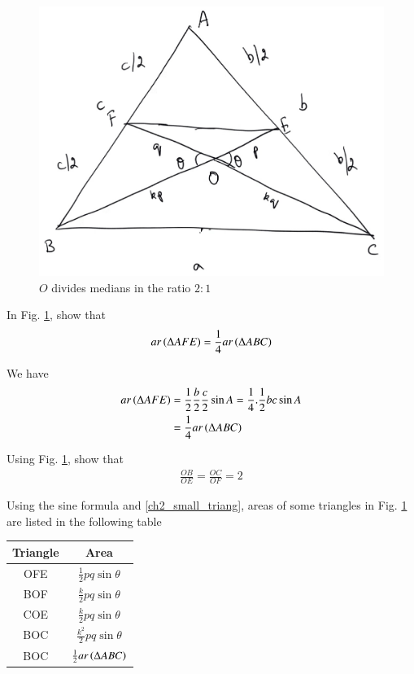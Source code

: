 \begin{figure}[!h]
	\begin{center}
		
		\includegraphics[width=\columnwidth]{./figs/ch2_median_ratio_val}
		\vspace*{-10cm}
	\end{center}
	\caption{$O$ divides medians in the ratio $2:1$}
	\label{ch2_median_ratio_val}	
\end{figure}
%
\begin{problem}
	In Fig. \ref{ch2_median_ratio_val}, show that
	\begin{equation}
	ar\left(\Delta AFE\right) = 	\frac{1}{4} ar\left(\Delta ABC\right)
	\end{equation}
	\label{ch2_small_triang}
\end{problem}
\proof We have
%
\begin{align}
ar\left(\Delta AFE\right) &= \frac{1}{2} \frac{b}{2}\frac{c}{2}\sin A = \frac{1}{4}.\frac{1}{2}bc \sin A \\
&=\frac{1}{4}ar\left(\Delta ABC\right)
\end{align}
%
\begin{problem}
	Using Fig. \ref{ch2_median_ratio_val}, show that
	\begin{align}
	\frac{OB}{OE} = \frac{OC}{OF} = 2
	\end{align}
\end{problem}
\proof Using the sine formula and \eqref{ch2_small_triang}, areas of some triangles in Fig. \ref{ch2_median_ratio_val} are listed in the following table
\begin{center}
\begin{tabular}{|c|c|}
	\hline  Triangle& Area  \\ 
	\hline  OFE & $\frac{1}{2}pq \sin \theta $ \\ 
	\hline  BOF &  $\frac{k}{2}pq \sin \theta$\\ 
	\hline  COE & $\frac{k}{2}pq \sin \theta$ \\ 
	\hline  BOC&  $\frac{k^2}{2}pq \sin \theta$\\
	\hline  BOC&  $\frac{1}{2} ar \left(\Delta ABC\right)$\\  
	\hline 
\end{tabular} 
\end{center}
